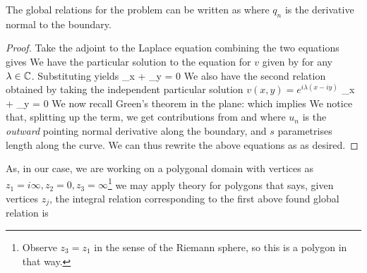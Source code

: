 \documentclass{article}
\begin{document}
\begin{claim}
The global relations for the problem can be written as 
where $q_n$ is the derivative normal to the boundary. 
\end{claim}
\begin{proof}
Take the adjoint to the Laplace equation 
combining the two equations gives 
We have the particular solution to the equation for $v$ given by 
for any $\lambda \in \mathbb{C}$. Substituting yields 
\be
{}_x + _y = 0
\ee
We also have the second relation obtained by taking the independent particular solution $v(x,y) = e^{i\lambda(x-iy)}$
\be
{}_x + _y = 0
\ee
We now recall Green's theorem in the plane: 
which implies 
We notice that, splitting up the term, we get contributions from 
and 
where $u_n$ is the \emph{outward} pointing normal derivative along the boundary, and $s$ parametrises length along the curve. We can thus rewrite the above equations as 
as desired. 
\end{proof}
As, in our case, we are working on a polygonal domain with vertices as $z_1 = i\infty, z_2 = 0, z_3 = \infty$\footnote{Observe $z_3 = z_1$ in the sense of the Riemann sphere, so this is a polygon in that way. } we may apply theory for polygons that says, given vertices $z_j$, the integral relation corresponding to the first above found global relation is 
\end{document}
